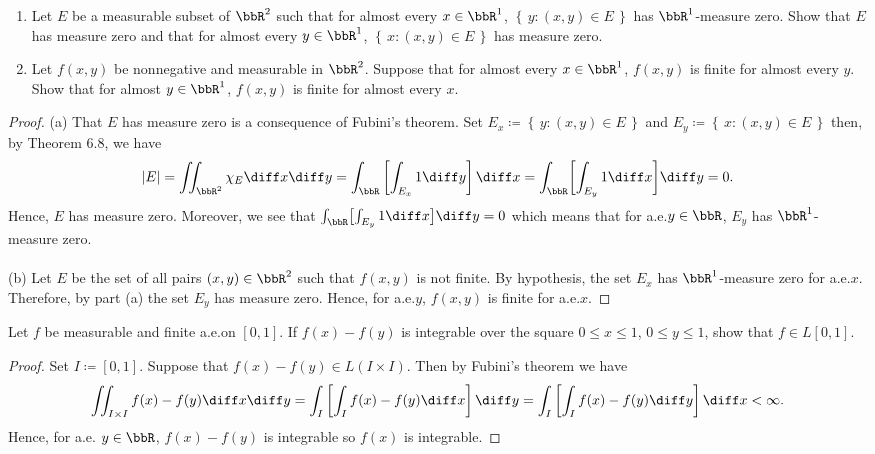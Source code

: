 
\begin{problem}
\begin{enumerate}[label=(\alph*)]
\item Let $E$ be a measurable subset of $\bbR^2$ such that for almost every
  $x\in\bbR^1$, $\left\{\,y:(x,y)\in E\,\right\}$ has
  $\bbR^1$-measure zero. Show that $E$ has measure zero and that for almost
  every $y\in\bbR^1$, $\left\{\,x:(x,y)\in E\,\right\}$ has
  measure zero.
\item Let $f(x,y)$ be nonnegative and measurable in $\bbR^2$. Suppose that
  for almost every $x\in\bbR^1$, $f(x,y)$ is finite for almost every
  $y$. Show that for almost $y\in\bbR^1$, $f(x,y)$ is finite for almost
  every $x$.
\end{enumerate}
\end{problem}
\begin{proof}
(a) That $E$ has measure zero is a consequence of Fubini's theorem. Set
$E_x\coloneqq\left\{\,y:(x,y)\in E\,\right\}$ and
$E_y\coloneqq\left\{\,x:(x,y)\in E\,\right\}$ then, by Theorem 6.8, we have
\begin{equation}
\label{eq:consequence-of-fubini}
|E|=
\iint_{\bbR^2}\chi_E\diff x\diff y=
\int_\bbR\left[\int_{E_x}1\diff y\right]\diff x=
\int_\bbR\biggl[\int_{E_y}1\diff x\biggr]\diff y=
0.
\end{equation}
Hence, $E$ has measure zero. Moreover, we see that
$\int_\bbR\bigl[\int_{E_y}1\diff x\bigr]\diff y=0$ which means that for
a.e.\@ $y\in\bbR$, $E_y$ has $\bbR^1$-measure zero.
\\\\
(b) Let $E$ be the set of all pairs $(x,y)\in\bbR^2$ such that $f(x,y)$ is
not finite. By hypothesis, the set $E_x$ has $\bbR^1$-measure zero for
a.e.\@ $x$. Therefore, by part (a) the set $E_y$ has measure zero. Hence,
for a.e.\@ $y$, $f(x,y)$ is finite for a.e.\@ $x$.
\end{proof}
\newpage

\begin{problem}
Let $f$ be measurable and finite a.e.\@ on $[0,1]$. If $f(x)-f(y)$ is
integrable over the square $0\leq x\leq 1$, $0\leq y\leq 1$, show that
$f\in L[0,1]$.
\end{problem}
\begin{proof}
Set $I\coloneqq[0,1]$. Suppose that $f(x)-f(y)\in L(I\times I)$. Then by
Fubini's theorem we have
\begin{equation}
  \label{eq:double-integral}
\iint_{I\times I}f(x)-f(y)\diff x\diff y=
\int_I\left[\int_I f(x)-f(y)\diff x\right]\diff y=
\int_I\left[\int_I f(x)-f(y)\diff y\right]\diff x<\infty.
\end{equation}
Hence, for a.e. $y\in\bbR$, $f(x)-f(y)$ is integrable so $f(x)$ is
integrable.
\end{proof}
\newpage


